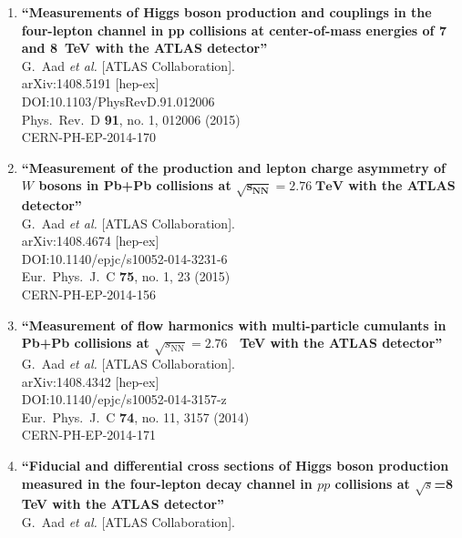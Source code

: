 \documentclass{article}
\begin{document}
\begin{enumerate}
\item%
{\bf ``Measurements of Higgs boson production and couplings in the four-lepton channel in pp collisions at center-of-mass energies of 7 and 8 TeV with the ATLAS detector''}
  \\{}G.~Aad {\it et al.} [ATLAS Collaboration].
  \\{}arXiv:1408.5191 [hep-ex]
  \\{}DOI:10.1103/PhysRevD.91.012006
  \\{}Phys.\ Rev.\ D {\bf 91}, no. 1, 012006 (2015)
  \\{}CERN-PH-EP-2014-170
\item%
{\bf ``Measurement of the production and lepton charge asymmetry of $W$ bosons in Pb+Pb collisions at $\mathbf {\sqrt{\mathbf {s}_{\mathrm {\mathbf {NN}}}}=2.76\;TeV}$ with the ATLAS detector''}
  \\{}G.~Aad {\it et al.} [ATLAS Collaboration].
  \\{}arXiv:1408.4674 [hep-ex]
  \\{}DOI:10.1140/epjc/s10052-014-3231-6
  \\{}Eur.\ Phys.\ J.\ C {\bf 75}, no. 1, 23 (2015)
  \\{}CERN-PH-EP-2014-156
\item%
{\bf ``Measurement of flow harmonics with multi-particle cumulants in Pb+Pb collisions at $\sqrt{s_{\mathrm {NN}}}=2.76$  TeV with the ATLAS detector''}
  \\{}G.~Aad {\it et al.} [ATLAS Collaboration].
  \\{}arXiv:1408.4342 [hep-ex]
  \\{}DOI:10.1140/epjc/s10052-014-3157-z
  \\{}Eur.\ Phys.\ J.\ C {\bf 74}, no. 11, 3157 (2014)
  \\{}CERN-PH-EP-2014-171
\item%
{\bf ``Fiducial and differential cross sections of Higgs boson production measured in the four-lepton decay channel in $pp$ collisions at $\sqrt{s}$=8 TeV with the ATLAS detector''}
  \\{}G.~Aad {\it et al.} [ATLAS Collaboration].

\end{enumerate}
\end{document}
